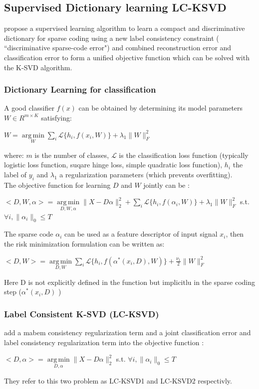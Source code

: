 \documentclass[a4paper,10pt]{article}
\DeclareMathOperator*{\argmin}{arg\,min}
\begin{document}
\subsection{Supervised Dictionary learning LC-KSVD}
\cite{6516503} propose a supervised learning algorithm to learn a compact and discriminative dictionary for sparse coding using a new label consistency constraint ( ``discriminative sparse-code error") and combined reconstruction error and classification error to form a unified objective function which can be solved with the K-SVD algorithm.
\subsubsection{Dictionary Learning for classification}
A good classifier $f(x)$ can be obtained by determining its model parameters $W \in R^{m \times K} $ satisfying:
\begin{center}
 $W = \underset{W}{\argmin} \underset{i}{\sum}\mathcal{L}\{h_i,f(x_i,W)\} + \lambda_1 \|W\|^2_F$
\end{center}
where: $m$ is the number of classes, $\mathcal{L}$ is the classification loss function (typically logistic loss function, suqare hinge loss, simple quadratic loss function), $h_i$ the label of $y_i$ and $\lambda_1$ a regularization parameters (which prevents overfitting).\\
The objective function for learning $D$ and $W$ jointly can be :
\begin{center}
 $<D,W,\alpha> = \underset{D,W,\alpha}{\argmin} \|X -D\alpha\|^2_2 + \underset{i}{\sum}\mathcal{L}\{h_i,f(\alpha_i,W)\} + \lambda_1 \|W\|^2_F$  s.t.  $\forall i, \|\alpha_i\|_0 \leq T$ 
\end{center}

The sparse code $\alpha_i$ can be used as a feature descriptor of input signal $x_i$, then the risk minimization formulation can be written as:
\begin{center}
 $<D,W> = \underset{D,W}{\argmin}\underset{i}{\sum}\mathcal{L}\{h_i,f(\alpha^*(x_i,D),W)\} + \frac{\nu_1}{2}\|W\|^2_F$
\end{center}
Here D is not explicitly defined in the function but implicitlu in the sparse coding step ($\alpha^*(x_i,D)$ )

\subsubsection{Label Consistent K-SVD (LC-KSVD)}
\cite{6516503} add a mabem consistency regularization term and a joint classification error and label consistency regularization term into the objective function :
\begin{center}
 $<D,\alpha> = \underset{D,\alpha}{\argmin} \|X - D\alpha\|^2_2$ s.t. $ \forall i, \|\alpha_i\|_0 \leq T$
\end{center}
They refer to this two problem as LC-KSVD1 and LC-KSVD2 respectivly.
\end{document}
